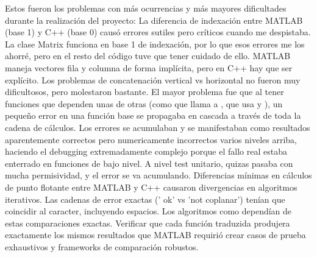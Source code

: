 \markdownRendererDocumentBegin
\markdownRendererSectionBegin
{}\markdownRendererInterblockSeparator
{}Estos fueron los problemas con más ocurrencias y más mayores dificultades durante la realización del proyecto:\markdownRendererInterblockSeparator
{}\markdownRendererSectionBegin
{}\markdownRendererInterblockSeparator
{}La diferencia de indexación entre MATLAB (base 1) y C++ (base 0) causó errores sutiles pero críticos cuando me despistaba. La clase Matrix funciona en base 1 de indexación, por lo que esos errores me los ahorré, pero en el resto del código tuve que tener cuidado de ello.\markdownRendererInterblockSeparator
{}
\markdownRendererSectionEnd \markdownRendererSectionBegin
{}\markdownRendererInterblockSeparator
{}MATLAB maneja vectores fila y columna de forma implícita, pero en C++ hay que ser explícito. Los problemas de concatenación vertical vs horizontal no fueron muy dificultosos, pero molestaron bastante.\markdownRendererInterblockSeparator
{}
\markdownRendererSectionEnd \markdownRendererSectionBegin
{}\markdownRendererInterblockSeparator
{}El mayor problema fue que al tener funciones que dependen unas de otras (como  que llama a , que usa  y ), un pequeño error en una función base se propagaba en cascada a través de toda la cadena de cálculos. Los errores se acumulaban y se manifestaban como resultados aparentemente correctos pero numericamente incorrectos varios niveles arriba, haciendo el debugging extremadamente complejo porque el fallo real estaba enterrado en funciones de bajo nivel. A nivel test unitario, quizas pasaba con mucha permisividad, y el error se va acumulando.\markdownRendererInterblockSeparator
{}
\markdownRendererSectionEnd \markdownRendererSectionBegin
{}\markdownRendererInterblockSeparator
{}Diferencias mínimas en cálculos de punto flotante entre MATLAB y C++ causaron divergencias en algoritmos iterativos.\markdownRendererInterblockSeparator
{}
\markdownRendererSectionEnd \markdownRendererSectionBegin
{}\markdownRendererInterblockSeparator
{}Las cadenas de error exactas (' ok' vs 'not coplanar') tenían que coincidir al caracter, incluyendo espacios. Los algoritmos como  dependían de estas comparaciones exactas.\markdownRendererInterblockSeparator
{}
\markdownRendererSectionEnd \markdownRendererSectionBegin
{}\markdownRendererInterblockSeparator
{}Verificar que cada función traduzida produjera exactamente los mismos resultados que MATLAB requirió crear casos de prueba exhaustivos y frameworks de comparación robustos.
\markdownRendererSectionEnd 
\markdownRendererSectionEnd \markdownRendererDocumentEnd